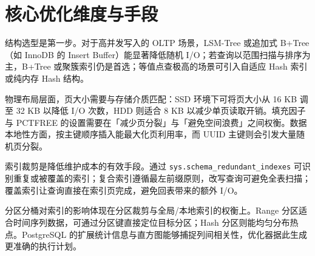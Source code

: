 \chapter{核心优化维度与手段}
结构选型是第一步。对于高并发写入的 OLTP 场景，LSM-Tree 或追加式 B+Tree（如 InnoDB 的 Insert Buffer）能显著降低随机 I/O；若查询以范围扫描与排序为主，B+Tree 或聚簇索引仍是首选；等值点查极高的场景可引入自适应 Hash 索引或纯内存 Hash 结构。\par
物理布局层面，页大小需要与存储介质匹配：SSD 环境下可将页大小从 16 KB 调至 32 KB 以降低 I/O 次数，HDD 则适合 8 KB 以减少单页读取开销。填充因子与 PCTFREE 的设置需要在「减少页分裂」与「避免空间浪费」之间权衡。数据本地性方面，按主键顺序插入能最大化页利用率，而 UUID 主键则会引发大量随机页分裂。\par
索引裁剪是降低维护成本的有效手段。通过 \texttt{sys.schema\_{}redundant\_{}indexes} 可识别重复或被覆盖的索引；复合索引遵循最左前缀原则，改写查询可避免全表扫描；覆盖索引让查询直接在索引页完成，避免回表带来的额外 I/O。\par
分区分桶对索引的影响体现在分区裁剪与全局/本地索引的权衡上。Range 分区适合时间序列数据，可通过分区键直接定位目标分区；Hash 分区则能均匀分布热点。PostgreSQL 的扩展统计信息与直方图能够捕捉列间相关性，优化器据此生成更准确的执行计划。\par
